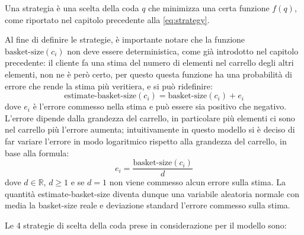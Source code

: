 Una strategia è una scelta della coda $q$ che minimizza una certa funzione $f(q)$, come riportato nel capitolo precedente alla \ref{eq:strategy}. 

Al fine di definire le strategie, è importante notare che la funzione $\text{basket-size}(c_i)$ non deve essere deterministica, come già introdotto nel capitolo precedente: il cliente fa una stima del numero di elementi nel carrello degli altri elementi, non ne è però certo, per questo questa funzione ha una probabilità di errore che rende la stima più veritiera, e si può ridefinire:
\begin{equation}\label{eq:estimate-basket-size}
\text{estimate-basket-size}(c_i) = \text{basket-size}(c_i) + e_i
\end{equation}
dove $e_i$ è l'errore commesso nella stima e può essere sia positivo che negativo. L'errore dipende dalla grandezza del carrello, in particolare più elementi ci sono nel carrello più l'errore aumenta; intuitivamente in questo modello si è deciso di far variare l'errore in modo logaritmico rispetto alla grandezza del carrello, in base alla formula:
\begin{equation}\label{eq:error-basket-size}
e_i = \frac{\text{basket-size}(c_i)}{d}
\end{equation}
dove $d \in \mathbb{R}$, $d \ge 1$ e se $d = 1$ non viene commesso alcun errore sulla stima. 
La quantità estimate-basket-size diventa dunque una variabile aleatoria normale con media la basket-size reale e deviazione standard l'errore commesso sulla stima.

Le 4 strategie di scelta della coda prese in considerazione per il modello sono:

